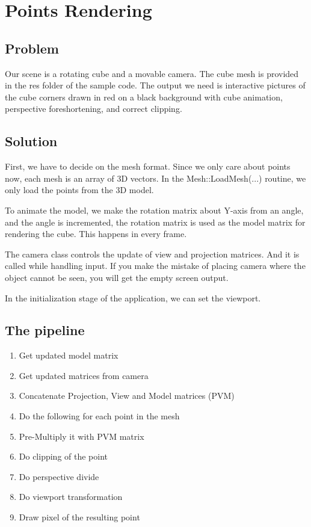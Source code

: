 \chapter{Points Rendering}
\section{Problem}
Our scene is a rotating cube and a movable camera. The cube mesh is provided in the res folder of the sample code. The output we need is interactive pictures of the cube corners drawn in red on a black background with cube animation, perspective foreshortening, and correct clipping.

\section{Solution}
First, we have to decide on the mesh format. Since we only care about points now, each mesh is an array of 3D vectors. In the Mesh::LoadMesh(...) routine, we only load the points from the 3D model.

To animate the model, we make the rotation matrix about Y-axis from an angle, and the angle is incremented, the rotation matrix is used as the model matrix for rendering the cube. This happens in every frame.

The camera class controls the update of view and projection matrices. And it is called while handling input. If you make the mistake of placing camera where the object cannot be seen, you will get the empty screen output.

In the initialization stage of the application, we can set the viewport. 

\section{The pipeline}
\begin{enumerate}
    \item Get updated model matrix
    \item Get updated matrices from camera
    \item Concatenate Projection, View and Model matrices (PVM)
    \item Do the following for each point in the mesh
    \item Pre-Multiply it with PVM matrix
    \item Do clipping of the point
    \item Do perspective divide
    \item Do viewport transformation
    \item Draw pixel of the resulting point
\end{enumerate}

